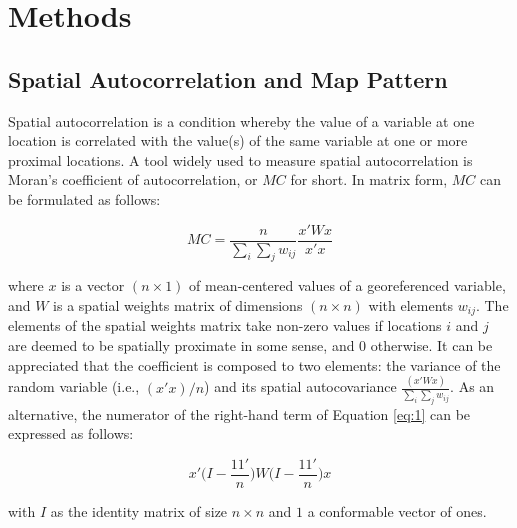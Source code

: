 \documentclass[sn-basic,lineno,pdflatex]{sn-jnl}
\theoremstyle{remark}
\theoremstyle{definition}
\begin{document}



\maketitle

\section{Methods}\label{methods}

\subsection{Spatial Autocorrelation and Map
Pattern}\label{spatial-autocorrelation-and-map-pattern}

Spatial autocorrelation is a condition whereby the value of a variable
at one location is correlated with the value(s) of the same variable at
one or more proximal locations. A tool widely used to measure spatial
autocorrelation is Moran's coefficient of autocorrelation, or \(MC\) for
short. In matrix form, \(MC\) can be formulated as follows:

\begin{equation} 
\label{eq:1}
MC=\frac{n}{\sum_{i}{\sum_{j}{w_{ij}}}}\frac{x'Wx}{x'x}
\end{equation}

where \(x\) is a vector \((n\times1)\) of mean-centered values of a
georeferenced variable, and \(W\) is a spatial weights matrix of
dimensions \((n\times n)\) with elements \(w_{ij}\). The elements of the
spatial weights matrix take non-zero values if locations \(i\) and \(j\)
are deemed to be spatially proximate in some sense, and 0 otherwise. It
can be appreciated that the coefficient is composed to two elements: the
variance of the random variable (i.e., \((x'x)/n\)) and its spatial
autocovariance \(\frac{(x'Wx)}{\sum_{i}{\sum_{j}{w_{ij}}}}\). As an
alternative, the numerator of the right-hand term of Equation \ref{eq:1}
can be expressed as follows:

\begin{equation} 
\label{eq:2}
x'\Big(I - \frac{11'}{n}\Big)W\Big(I - \frac{11'}{n}\Big)x
\end{equation}

with \(I\) as the identity matrix of size \(n\times n\) and \(1\) a
conformable vector of ones.
\end{document}
